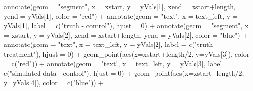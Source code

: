 \documentclass[
  letterpaper,
  DIV=11,
  numbers=noendperiod]{scrreprt}
\newenvironment{Shaded}{\begin{snugshade}}{\end{snugshade}}
\newcommand{\AttributeTok}[1]{\textcolor[rgb]{0.40,0.45,0.13}{#1}}
\newcommand{\DecValTok}[1]{\textcolor[rgb]{0.68,0.00,0.00}{#1}}
\newcommand{\FunctionTok}[1]{\textcolor[rgb]{0.28,0.35,0.67}{#1}}
\newcommand{\NormalTok}[1]{\textcolor[rgb]{0.00,0.23,0.31}{#1}}
\newcommand{\SpecialCharTok}[1]{\textcolor[rgb]{0.37,0.37,0.37}{#1}}
\newcommand{\StringTok}[1]{\textcolor[rgb]{0.13,0.47,0.30}{#1}}
\begin{document}
\begin{Shaded}
\begin{Highlighting}[]
   \FunctionTok{annotate}\NormalTok{(}\AttributeTok{geom =} \StringTok{"segment"}\NormalTok{, }\AttributeTok{x =}\NormalTok{ xstart, }\AttributeTok{y =}\NormalTok{ yVals[}\DecValTok{1}\NormalTok{], }\AttributeTok{xend =}\NormalTok{ xstart}\SpecialCharTok{+}\NormalTok{length, }\AttributeTok{yend =}\NormalTok{ yVals[}\DecValTok{1}\NormalTok{], }\AttributeTok{color =} \StringTok{"red"}\NormalTok{) }\SpecialCharTok{+}
   \FunctionTok{annotate}\NormalTok{(}\AttributeTok{geom =} \StringTok{"text"}\NormalTok{, }\AttributeTok{x =}\NormalTok{ text\_left, }\AttributeTok{y =}\NormalTok{ yVals[}\DecValTok{1}\NormalTok{], }\AttributeTok{label =} \FunctionTok{c}\NormalTok{(}\StringTok{"truth {-} control"}\NormalTok{), }\AttributeTok{hjust =} \DecValTok{0}\NormalTok{) }\SpecialCharTok{+}
   \FunctionTok{annotate}\NormalTok{(}\AttributeTok{geom =} \StringTok{"segment"}\NormalTok{, }\AttributeTok{x =}\NormalTok{ xstart, }\AttributeTok{y =}\NormalTok{ yVals[}\DecValTok{2}\NormalTok{], }\AttributeTok{xend =}\NormalTok{ xstart}\SpecialCharTok{+}\NormalTok{length, }\AttributeTok{yend =}\NormalTok{ yVals[}\DecValTok{2}\NormalTok{], }\AttributeTok{color =} \StringTok{"blue"}\NormalTok{) }\SpecialCharTok{+}
   \FunctionTok{annotate}\NormalTok{(}\AttributeTok{geom =} \StringTok{"text"}\NormalTok{, }\AttributeTok{x =}\NormalTok{ text\_left, }\AttributeTok{y =}\NormalTok{ yVals[}\DecValTok{2}\NormalTok{], }\AttributeTok{label =} \FunctionTok{c}\NormalTok{(}\StringTok{"truth {-} treatment"}\NormalTok{), }\AttributeTok{hjust =} \DecValTok{0}\NormalTok{) }\SpecialCharTok{+}
   \FunctionTok{geom\_point}\NormalTok{(}\FunctionTok{aes}\NormalTok{(}\AttributeTok{x=}\NormalTok{xstart}\SpecialCharTok{+}\NormalTok{length}\SpecialCharTok{/}\DecValTok{2}\NormalTok{, }\AttributeTok{y=}\NormalTok{yVals[}\DecValTok{3}\NormalTok{]), }\AttributeTok{color =} \FunctionTok{c}\NormalTok{(}\StringTok{"red"}\NormalTok{)) }\SpecialCharTok{+}
   \FunctionTok{annotate}\NormalTok{(}\AttributeTok{geom =} \StringTok{"text"}\NormalTok{, }\AttributeTok{x =}\NormalTok{ text\_left, }\AttributeTok{y =}\NormalTok{ yVals[}\DecValTok{3}\NormalTok{], }\AttributeTok{label =} \FunctionTok{c}\NormalTok{(}\StringTok{"simulated data {-} control"}\NormalTok{), }\AttributeTok{hjust =} \DecValTok{0}\NormalTok{) }\SpecialCharTok{+}
   \FunctionTok{geom\_point}\NormalTok{(}\FunctionTok{aes}\NormalTok{(}\AttributeTok{x=}\NormalTok{xstart}\SpecialCharTok{+}\NormalTok{length}\SpecialCharTok{/}\DecValTok{2}\NormalTok{, }\AttributeTok{y=}\NormalTok{yVals[}\DecValTok{4}\NormalTok{]), }\AttributeTok{color =} \FunctionTok{c}\NormalTok{(}\StringTok{"blue"}\NormalTok{)) }\SpecialCharTok{+}

\end{Highlighting}
\end{Shaded}
\end{document}
